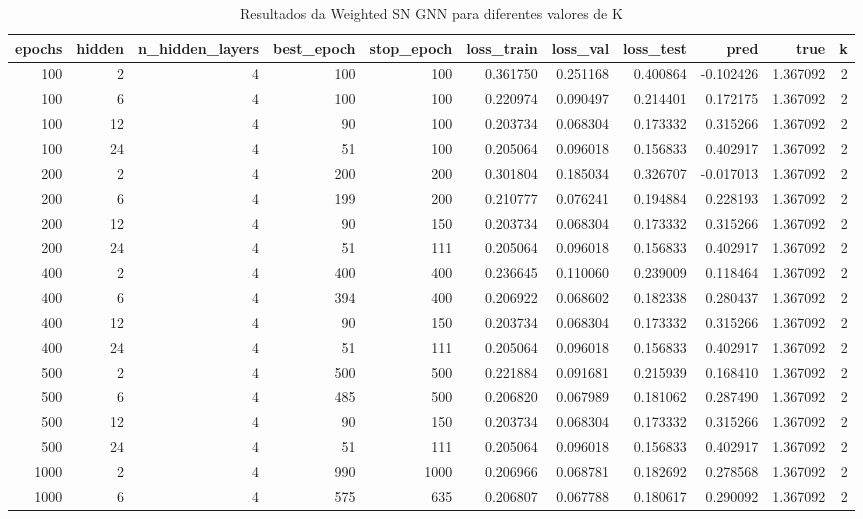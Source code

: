\begin{table}
\caption{Resultados da Weighted SN GNN para diferentes valores de K}
\label{tab:weighted_gnn_results_all_k}
\begin{tabular}{rrrrrrrrrrr}
\toprule
epochs & hidden & n\_hidden\_layers & best\_epoch & stop\_epoch & loss\_train & loss\_val & loss\_test & pred & true & k \\
\midrule
100 & 2 & 4 & 100 & 100 & 0.361750 & 0.251168 & 0.400864 & -0.102426 & 1.367092 & 2 \\
100 & 6 & 4 & 100 & 100 & 0.220974 & 0.090497 & 0.214401 & 0.172175 & 1.367092 & 2 \\
100 & 12 & 4 & 90 & 100 & 0.203734 & 0.068304 & 0.173332 & 0.315266 & 1.367092 & 2 \\
100 & 24 & 4 & 51 & 100 & 0.205064 & 0.096018 & 0.156833 & 0.402917 & 1.367092 & 2 \\
200 & 2 & 4 & 200 & 200 & 0.301804 & 0.185034 & 0.326707 & -0.017013 & 1.367092 & 2 \\
200 & 6 & 4 & 199 & 200 & 0.210777 & 0.076241 & 0.194884 & 0.228193 & 1.367092 & 2 \\
200 & 12 & 4 & 90 & 150 & 0.203734 & 0.068304 & 0.173332 & 0.315266 & 1.367092 & 2 \\
200 & 24 & 4 & 51 & 111 & 0.205064 & 0.096018 & 0.156833 & 0.402917 & 1.367092 & 2 \\
400 & 2 & 4 & 400 & 400 & 0.236645 & 0.110060 & 0.239009 & 0.118464 & 1.367092 & 2 \\
400 & 6 & 4 & 394 & 400 & 0.206922 & 0.068602 & 0.182338 & 0.280437 & 1.367092 & 2 \\
400 & 12 & 4 & 90 & 150 & 0.203734 & 0.068304 & 0.173332 & 0.315266 & 1.367092 & 2 \\
400 & 24 & 4 & 51 & 111 & 0.205064 & 0.096018 & 0.156833 & 0.402917 & 1.367092 & 2 \\
500 & 2 & 4 & 500 & 500 & 0.221884 & 0.091681 & 0.215939 & 0.168410 & 1.367092 & 2 \\
500 & 6 & 4 & 485 & 500 & 0.206820 & 0.067989 & 0.181062 & 0.287490 & 1.367092 & 2 \\
500 & 12 & 4 & 90 & 150 & 0.203734 & 0.068304 & 0.173332 & 0.315266 & 1.367092 & 2 \\
500 & 24 & 4 & 51 & 111 & 0.205064 & 0.096018 & 0.156833 & 0.402917 & 1.367092 & 2 \\
1000 & 2 & 4 & 990 & 1000 & 0.206966 & 0.068781 & 0.182692 & 0.278568 & 1.367092 & 2 \\
1000 & 6 & 4 & 575 & 635 & 0.206807 & 0.067788 & 0.180617 & 0.290092 & 1.367092 & 2 \\

\end{tabular}
\end{table}
